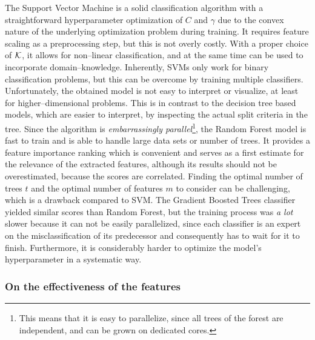 The Support Vector Machine is a solid classification algorithm with a straightforward hyperparameter optimization of $C$ and $\gamma$ due to the convex nature of the underlying optimization problem during training. It requires feature scaling as a preprocessing step, but this is not overly costly. With a proper choice of $\mathcal{K}$, it allows for non--linear classification, and at the same time can be used to incorporate domain--knowledge. Inherently, SVMs only work for binary classification problems, but this can be overcome by training multiple classifiers. Unfortunately, the obtained model is not easy to interpret or visualize, at least for higher--dimensional problems. This is in contrast to the decision tree based models, which are easier to interpret, \eg by inspecting the actual split criteria in the tree. Since the algorithm is \emph{embarrassingly parallel}\footnote{This means that it is easy to parallelize, since all trees of the forest are independent, and can be grown on dedicated cores.}, the Random Forest model is fast to train and is able to handle large data sets or number of trees. It provides a feature importance ranking which is convenient and serves as a first estimate for the relevance of the extracted features, although its results should not be overestimated, \eg because the scores are correlated. Finding the optimal number of trees $t$ and the optimal number of features $m$ to consider can be challenging, which is a drawback compared to SVM. The Gradient Boosted Trees classifier yielded similar scores than Random Forest, but the training process was \emph{a lot} slower because it can not be easily parallelized, since each classifier is an expert on the misclassification of its predecessor and consequently has to wait for it to finish. Furthermore, it is considerably harder to optimize the model's hyperparameter in a systematic way.

\subsubsection*{On the effectiveness of the features}

